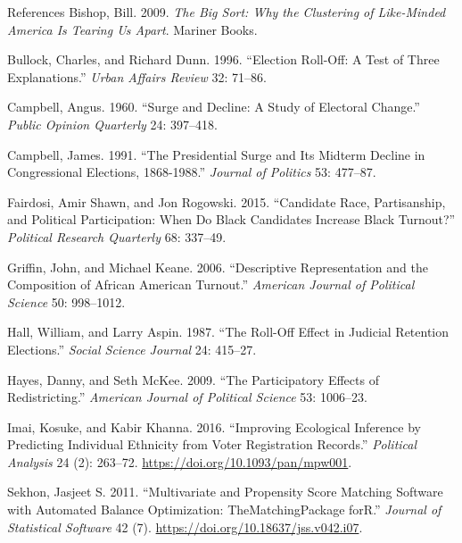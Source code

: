 \documentclass[
  ignorenonframetext,
]{beamer}
\newlength{\cslhangindent}
\newenvironment{cslreferences}%
  {\setlength{\parindent}{0pt}%
  \everypar{\setlength{\hangindent}{\cslhangindent}}\ignorespaces}%
  {\par}
\begin{document}
\begin{frame}{References}
\protect\hypertarget{references}{}
\hypertarget{refs}{}
\begin{cslreferences}
\leavevmode\hypertarget{ref-Bishop2009}{}%
Bishop, Bill. 2009. \emph{The Big Sort: Why the Clustering of
Like-Minded America Is Tearing Us Apart}. Mariner Books.

\leavevmode\hypertarget{ref-Bullock1996}{}%
Bullock, Charles, and Richard Dunn. 1996. ``Election Roll-Off: A Test of
Three Explanations.'' \emph{Urban Affairs Review} 32: 71--86.

\leavevmode\hypertarget{ref-Campbell1960}{}%
Campbell, Angus. 1960. ``Surge and Decline: A Study of Electoral
Change.'' \emph{Public Opinion Quarterly} 24: 397--418.

\leavevmode\hypertarget{ref-Campbell1991}{}%
Campbell, James. 1991. ``The Presidential Surge and Its Midterm Decline
in Congressional Elections, 1868-1988.'' \emph{Journal of Politics} 53:
477--87.

\leavevmode\hypertarget{ref-Fairdosi2015}{}%
Fairdosi, Amir Shawn, and Jon Rogowski. 2015. ``Candidate Race,
Partisanship, and Political Participation: When Do Black Candidates
Increase Black Turnout?'' \emph{Political Research Quarterly} 68:
337--49.

\leavevmode\hypertarget{ref-Griffin2006}{}%
Griffin, John, and Michael Keane. 2006. ``Descriptive Representation and
the Composition of African American Turnout.'' \emph{American Journal of
Political Science} 50: 998--1012.

\leavevmode\hypertarget{ref-Hall1987}{}%
Hall, William, and Larry Aspin. 1987. ``The Roll-Off Effect in Judicial
Retention Elections.'' \emph{Social Science Journal} 24: 415--27.

\leavevmode\hypertarget{ref-Hayes2009}{}%
Hayes, Danny, and Seth McKee. 2009. ``The Participatory Effects of
Redistricting.'' \emph{American Journal of Political Science} 53:
1006--23.

\leavevmode\hypertarget{ref-Imai2016}{}%
Imai, Kosuke, and Kabir Khanna. 2016. ``Improving Ecological Inference
by Predicting Individual Ethnicity from Voter Registration Records.''
\emph{Political Analysis} 24 (2): 263--72.
\url{https://doi.org/10.1093/pan/mpw001}.

\leavevmode\hypertarget{ref-Sekhon2011}{}%
Sekhon, Jasjeet S. 2011. ``Multivariate and Propensity Score Matching
Software with Automated Balance Optimization: TheMatchingPackage forR.''
\emph{Journal of Statistical Software} 42 (7).
\url{https://doi.org/10.18637/jss.v042.i07}.


\end{cslreferences}
\end{frame}
\end{document}
